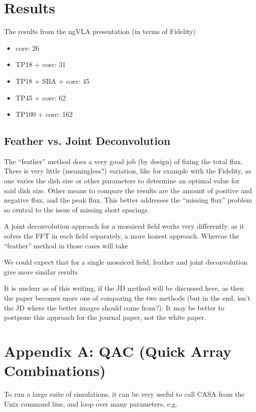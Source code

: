 \documentclass[11pt,twoside]{article}
\begin{document}
\section{Results}

The results from the ngVLA presentation (in terms of Fidelity)
\begin{itemize}
  \item core:  26
  \item TP18 + core: 31
  \item TP18 + SBA + core: 45
  \item TP45 + core: 62
  \item TP100 + core: 162
\end{itemize}



\subsection{Feather vs. Joint Deconvolution}

The ``feather'' method does a very good job (by design) of fixing the total flux. There is
very little (meaningless?) variation, like for example with the Fidelity, as one varies
the dish size or other parameters to determine an optimal value for said dish size.
Other means to compare the results are the amount of positive and negative flux,
and the peak flux. This better addresses the ``missing flux'' problem so central to the
issue of missing short spacings.

A joint deconvolution approach for a mosaiced field works very differently, as it solves the
FFT in each field separately, a more honest approach. Whereas the ``feather'' method in those
cases will take

We could expect that for a single mosaiced field, feather and joint deconvolution give more similar results

It is unclear as of this writing, if the JD method will be discussed here, as then the paper becomes more
one of comparing the two methods (but in the end, isn't the JD where the better images should come from?).
It may be better to postpone this approach for the journal paper, not the white paper.



\section*{Appendix A: QAC (Quick Array Combinations)}

To run a large suite of simulations, it can be very useful to call CASA from the Unix command line,
and loop over many parameters, e.g.
\end{document}
